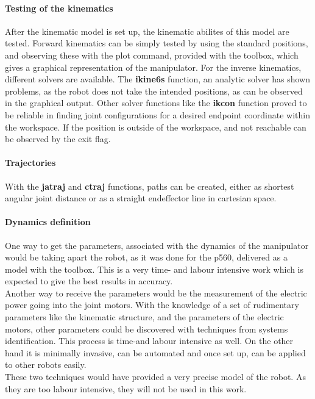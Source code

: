 \paragraph{Testing of the kinematics}
After the kinematic model is set up, the kinematic abilites of this model are tested. 
Forward kinematics can be simply tested by using the standard positions, and observing these with the plot command, provided with the toolbox, which gives a graphical representation of the manipulator.
For the inverse kinematics, different solvers are available. The \textbf{ikine6s} function, an analytic solver has shown problems, as the robot does not take the intended positions, as can be observed in the graphical output.
Other solver functions like the \textbf{ikcon} function proved to be reliable in finding joint configurations for a desired endpoint coordinate within the workspace. If the position is outside of the workspace, and not reachable can be observed by the exit flag.

\paragraph{Trajectories}
With the \textbf{jatraj} and \textbf{ctraj} functions, paths can be created, either as shortest angular joint distance or as a straight endeffector line in cartesian space.

\paragraph{Dynamics definition}
One way to get the parameters, associated with the dynamics of the manipulator would be taking apart the robot, as it was done for the p560, delivered as a model with the toolbox.
This is a very time- and labour intensive work which is expected to give the best results in accuracy.\\
Another way to receive the parameters would be the measurement of the electric power going into the joint motors. With the knowledge of a set of rudimentary parameters like the kinematic structure, and the parameters of the electric motors, other parameters could be discovered with techniques from systems identification. This process is time-and labour intensive as well. On the other hand it is minimally invasive, can be automated and once set up, can be applied to other robots easily.\\
These two techniques would have provided a very precise model of the robot. As they are too labour intensive, they will not be used in this work.\\

